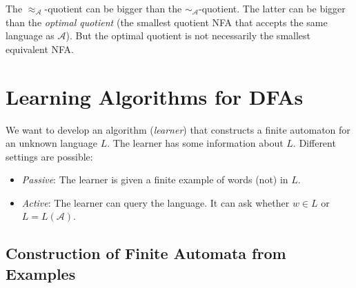 \documentclass[english]{panikzettel}
\begin{document}
The $\approx_\mathcal{A}$-quotient can be bigger than the $\sim_\mathcal{A}$-quotient.
The latter can be bigger than the \emph{optimal quotient} (the smallest quotient NFA that accepts the same language as $\mathcal{A}$).
But the optimal quotient is not necessarily the smallest equivalent NFA.

\newpage

\section{Learning Algorithms for DFAs}
We want to develop an algorithm (\emph{learner}) that constructs a finite automaton for an unknown language $L$.
The learner has some information about $L$.
Different settings are possible:
\begin{itemize}
    \item \emph{Passive}: The learner is given a finite example of words (not) in $L$.
    \item \emph{Active}: The learner can query the language. It can ask whether $w \in L$ or $L=L(\mathcal{A})$.
\end{itemize}

\subsection{Construction of Finite Automata from Examples}
\end{document}
